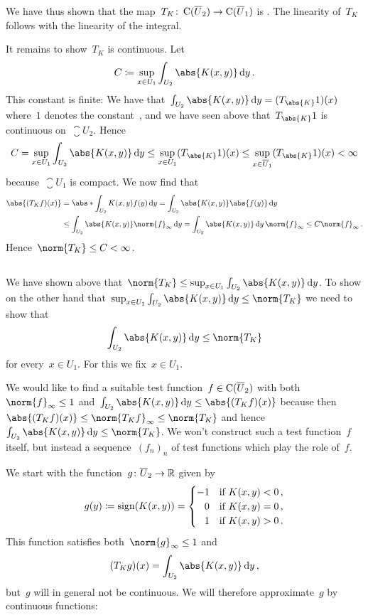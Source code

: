 We have thus shown that the map~$T_K \colon \operatorname{C}(\overline{U}_2) \to \operatorname{C}(\overline{U}_1)$ is {\welldef}.
The linearity of~$T_K$ follows with the linearity of the integral.

It remains to show~$T_K$ is continuous.
Let
\[
            C
  \defined  \sup_{x \in U_1} \int_{U_2} \abs{K(x,y)} \dd{y} \,.
\]
This constant is finite:
We have that~$\int_{U_2} \abs{K(x,y)} \dd{y} = (T_{\abs{K}} 1)(x)$ where~$1$ denotes the constant~, and we have seen above that~$T_{\abs{K}} 1$ is continuous on~$\closure{U}_2$.
Hence
\[
        C
  =     \sup_{x \in U_1} \int_{U_2} \abs{K(x,y)} \dd{y}
  \leq  \sup_{x \in U_1} (T_{\abs{K}} 1)(x)
  \leq  \sup_{x \in \closure{U}_1} (T_{\abs{K}} 1)(x)
  <     \infty
\]
because~$\closure{U}_1$ is compact.
We now find that
\begin{align*}
        \abs{(T_K f)(x)}
  &=    \abs*{ \int_{U_2} K(x,y) f(y) \dd{y} }
   =    \int_{U_2} \abs{K(x,y)} \abs{f(y)} \dd{y} \\
  &\leq \int_{U_2} \abs{K(x,y)} \norm{f}_\infty \dd{y}
   =    \int_{U_2} \abs{K(x,y)} \dd{y} \, \norm{f}_\infty
   \leq C \norm{f}_\infty \,.
\end{align*}
Hence~$\norm{T_K} \leq C < \infty$.





\subsection{}

We have shown above that~$\norm{T_K} \leq \sup_{x \in U_1} \int_{U_2} \abs{K(x,y)} \dd{y}$.
To show on the other hand that~$\sup_{x \in U_1} \int_{U_2} \abs{K(x,y)} \dd{y} \leq \norm{T_K}$ we need to show that
\[
        \int_{U_2} \abs{K(x,y)} \dd{y}
  \leq  \norm{T_K}
\]
for every~$x \in U_1$.
For this we fix~$x \in U_1$.

We would like to find a suitable test function~$f \in \operatorname{C}(\overline{U}_2)$ with both~$\norm{f}_\infty \leq 1$ and~$\int_{U_2} \abs{K(x,y)} \dd{y} \leq \abs{(T_K f)(x)}$ because then~$\abs{(T_K f)(x)} \leq \norm{T_K f}_\infty \leq \norm{T_K}$ and hence~$\int_{U_2} \abs{K(x,y)} \dd{y} \leq \norm{T_K}$.
We won’t construct such a test function~$f$ itself, but instead a sequence~$(f_n)_n$ of test functions which play the role of~$f$.

We start with the function~$g \colon \overline{U}_2 \to \mathbb{R}$ given by
\[
            g(y)
  \coloneqq  \operatorname{sign}(K(x,y))
  =         \begin{cases}
                        -1  & \text{if~$K(x,y) < 0$}  \,, \\
              \phantom{-}0  & \text{if~$K(x,y) = 0$}  \,, \\
              \phantom{-}1  & \text{if~$K(x,y) > 0$}  \,.
            \end{cases}
\]
This function satisfies both~$\norm{g}_\infty \leq 1$ and
\begin{equation}
  \label{property of g}
    (T_K g)(x)
  = \int_{U_2} \abs{K(x,y)} \dd{y} \,,
\end{equation}
but~$g$ will in general not be continuous.
We will therefore approximate~$g$ by continuous functions:

